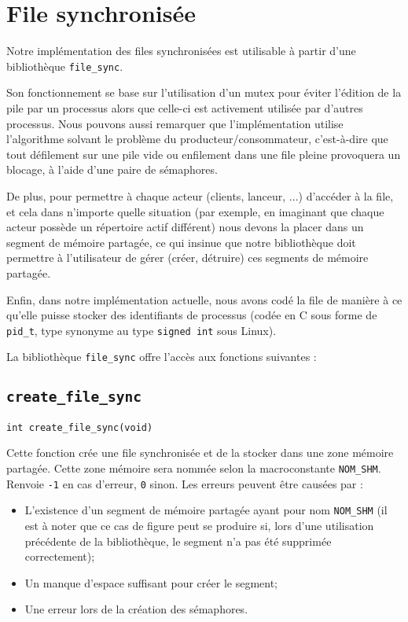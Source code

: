\documentclass[12pt]{article}
\begin{document}
    \section{File synchronisée}
    Notre implémentation des files synchronisées est utilisable à partir d'une bibliothèque \texttt{file\_sync}.

    Son fonctionnement se base sur l'utilisation d'un mutex pour éviter l'édition de la pile par un processus alors que celle-ci est activement utilisée par d'autres processus. Nous pouvons aussi remarquer que l'implémentation utilise l'algorithme solvant le problème du producteur/consommateur, c'est-à-dire que tout défilement sur une pile vide ou enfilement dans une file pleine provoquera un blocage, à l'aide d'une paire de sémaphores.

    De plus, pour permettre à chaque acteur (clients, lanceur, ...) d'accéder à la file, et cela dans n'importe quelle situation (par exemple, en imaginant que chaque acteur possède un répertoire actif différent) nous devons la placer dans un segment de mémoire partagée, ce qui insinue que notre bibliothèque doit permettre à l'utilisateur de gérer (créer, détruire) ces segments de mémoire partagée.

    Enfin, dans notre implémentation actuelle, nous avons codé la file de manière à ce qu'elle puisse stocker des identifiants de processus (codée en C sous forme de \texttt{pid\_t}, type synonyme au type \texttt{signed int} sous Linux).

    La bibliothèque \texttt{file\_sync} offre l'accès aux fonctions suivantes :

    \subsection{\texttt{create\_file\_sync}}

    \begin{center}
        \texttt{int create\_file\_sync(void)}
    \end{center}

    Cette fonction crée une file synchronisée et de la stocker dans une zone mémoire partagée. Cette zone mémoire sera nommée selon la macroconstante \texttt{NOM\_SHM}.
    Renvoie \texttt{-1} en cas d'erreur, \texttt{0} sinon. Les erreurs peuvent être causées par :
    \begin{itemize}
        \item L'existence d'un segment de mémoire partagée ayant pour nom \texttt{NOM\_SHM} (il est à noter que ce cas de figure peut se produire si, lors d'une utilisation précédente de la bibliothèque, le segment n'a pas été supprimée correctement);
        \item Un manque d'espace suffisant pour créer le segment;
        \item Une erreur lors de la création des sémaphores.
    \end{itemize}
\end{document}
